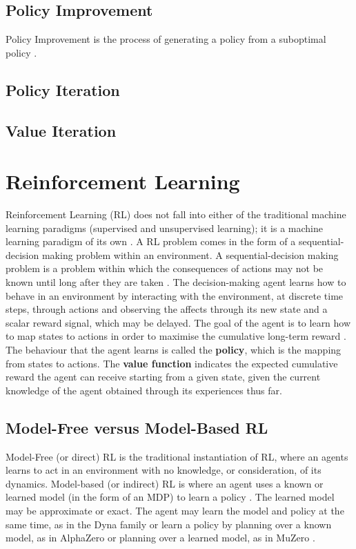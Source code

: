 \subsection{Policy Improvement}
Policy Improvement \cite{Bellman:1957} is the process of generating a policy from a suboptimal policy \cite{DBLP:books/lib/Bertsekas05}.
\subsection{Policy Iteration}
\cite{Bellman:1957, howard:dp}
\subsection{Value Iteration}
\cite{series/synthesis/2010Szepesvari}
\section{Reinforcement Learning}
Reinforcement Learning (RL) does not fall into either of the traditional machine learning paradigms (supervised and unsupervised learning); it is a machine learning paradigm of its own \cite{DBLP:journals/corr/cs-AI-9605103}.
A RL problem comes in the form of a sequential-decision making problem within an environment. A sequential-decision making problem is a problem within which the consequences of actions may not be known until long after they are taken \cite{barto1990learning}. The decision-making agent learns how to behave in an environment by interacting with the environment, at discrete time steps, through actions and observing the affects through its new state and a scalar reward signal, which may be delayed. The goal of the agent is to learn how to map states to actions in order to maximise the cumulative long-term reward \cite{Sutton1998}. The behaviour that the agent learns is called the \textbf{policy}, which is the mapping from states to actions. The \textbf{value function} indicates the expected cumulative reward the agent can receive starting from a given state, given the current knowledge of the agent obtained through its experiences thus far.

\subsection{Model-Free versus Model-Based RL}
Model-Free (or direct) RL is the traditional instantiation of RL, where an agents learns to act in an environment with no knowledge, or consideration, of its dynamics.
Model-based (or indirect) RL is where an agent uses a known or learned model (in the form of an MDP) to learn a policy \cite{MAL-086, RLSOTA11}. The learned model may be approximate or exact. The agent may learn the model and policy at the same time, as in the Dyna family \cite{Sutton:1990, 10.1145/122344.122377} or learn a policy by planning over a known model, as in AlphaZero \cite{DBLP:journals/corr/abs-1712-01815} or planning over a learned model, as in MuZero \cite{DBLP:journals/corr/abs-1911-08265}.

